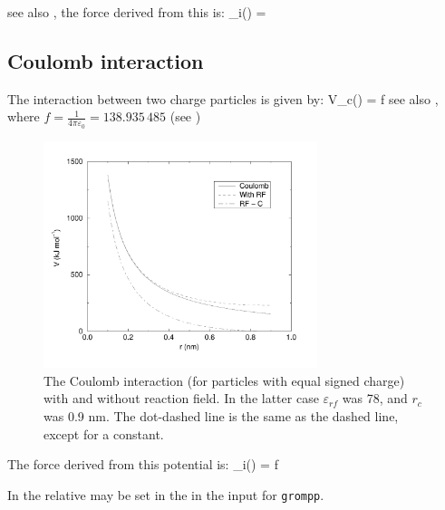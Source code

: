 see also , the force derived from this is:
\beq
 _i(\rij) =  \rnorm
\eeq

\subsection{Coulomb interaction}
\label{sec:coul}
\newcommand{\epsr}{\varepsilon_r}
\newcommand{\epsrf}{\varepsilon_{rf}}
The  interaction between two charge particles is given by:
\beq
V_c(\rij) = f \frac{q_i q_j}{\epsr \rij}
\label{eqn:vcoul}
\eeq
see also , where $f = \frac{1}{4\pi \varepsilon_0} =
138.935\,485$ (see )

\begin{figure}
\centerline{\includegraphics[width=8cm]{plots/vcrf}}
\caption[The Coulomb interaction with and without reaction field.]{The
Coulomb interaction (for particles with equal signed charge) with and
without reaction field. In the latter case $\epsrf$ was 78, and $r_c$
was 0.9 nm. The dot-dashed line is the same as the dashed line, except
for a constant.}
\label{fig:coul}
\end{figure}

The force derived from this potential is:
\beq
{}_i(\rvij) = f \frac{q_i q_j}{\epsr\rij^2}\rnorm
\eeq

In {\gromacs} the  relative  
\normindex{$\epsr$}
may be set in the in the input for {\tt grompp}. 


